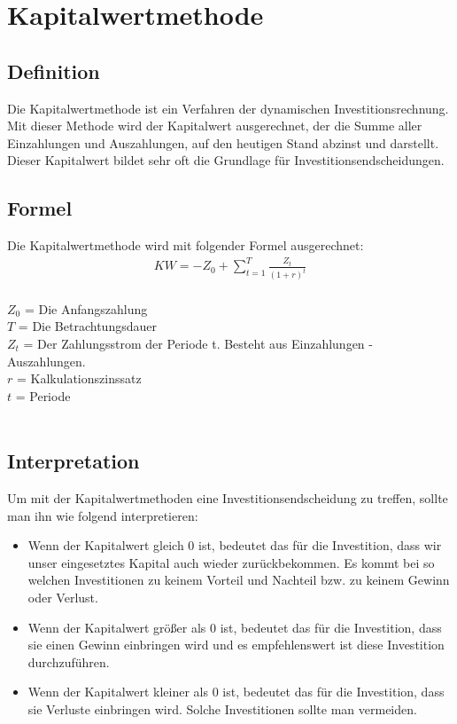 \chapter{Kapitalwertmethode}
\label{Kapitalwertmethode}

\section{Definition}
Die Kapitalwertmethode ist ein Verfahren der dynamischen Investitionsrechnung. Mit dieser Methode wird der Kapitalwert ausgerechnet, der die Summe aller Einzahlungen und Auszahlungen, auf den heutigen Stand abzinst und darstellt. Dieser Kapitalwert bildet sehr oft die Grundlage für Investitionsendscheidungen.

\section{Formel}
Die Kapitalwertmethode wird mit folgender Formel ausgerechnet:
\begin{align*}
    KW = -Z_{0} + \sum \limits_{t=1}^{T}{\frac{Z_{t}}{(1+r)^{t}}}
\end{align*}
\\
$Z_0$ = Die Anfangszahlung \\
$T$  = Die Betrachtungsdauer\\
$Z_t$ = Der Zahlungsstrom der Periode t. Besteht aus Einzahlungen - Auszahlungen.\\
$r$ = Kalkulationszinssatz\\
$t$ = Periode\\ \\
\newpage
\section{Interpretation}
Um mit der Kapitalwertmethoden eine Investitionsendscheidung zu treffen, sollte man ihn wie folgend interpretieren:
\begin{itemize}
    \item Wenn der Kapitalwert gleich 0 ist, bedeutet das für die Investition, dass wir unser eingesetztes Kapital auch wieder zurückbekommen. Es kommt bei so welchen Investitionen zu keinem Vorteil und Nachteil bzw. zu keinem Gewinn oder Verlust.
    \item Wenn der Kapitalwert größer als 0 ist, bedeutet das für die Investition, dass sie einen Gewinn einbringen wird und es empfehlenswert ist diese Investition durchzuführen.
    \item Wenn der Kapitalwert kleiner als 0 ist, bedeutet das für die Investition, dass sie Verluste einbringen wird. Solche Investitionen sollte man vermeiden.
\end{itemize}


